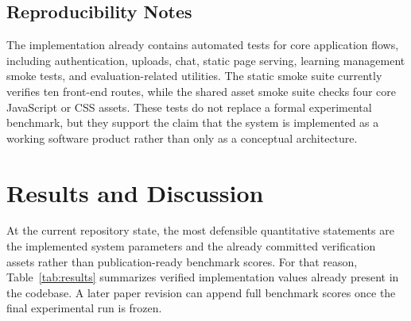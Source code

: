 \documentclass[11pt,a4paper]{article}
\begin{document}
\subsection{Reproducibility Notes}

The implementation already contains automated tests for core application flows, including authentication, uploads, chat, static page serving, learning management smoke tests, and evaluation-related utilities. The static smoke suite currently verifies ten front-end routes, while the shared asset smoke suite checks four core JavaScript or CSS assets. These tests do not replace a formal experimental benchmark, but they support the claim that the system is implemented as a working software product rather than only as a conceptual architecture.

\section{Results and Discussion}

At the current repository state, the most defensible quantitative statements are the implemented system parameters and the already committed verification assets rather than publication-ready benchmark scores. For that reason, Table~\ref{tab:results} summarizes verified implementation values already present in the codebase. A later paper revision can append full benchmark scores once the final experimental run is frozen.
\end{document}
